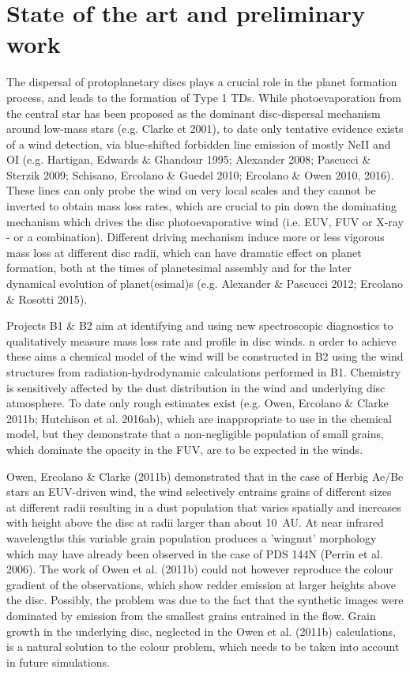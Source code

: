 \documentclass[10pt,fleqn,twoside]{article}
\newcommand{\Tcol}{\color{blue}}
\begin{document}
\section{\Tcol State of the art and preliminary work}
\renewcommand{\leftmark}{\sc State of the Art and preliminary work}

The dispersal of protoplanetary discs plays a crucial role in the
planet formation process, and leads to the formation of Type
1 TDs. While photoevaporation from the central star has been proposed
as the dominant disc-dispersal mechanism around low-mass stars
(e.g. Clarke et 2001), to date only tentative evidence exists of a
wind detection, via blue-shifted forbidden line emission of mostly
NeII and OI (e.g. Hartigan, Edwards \& Ghandour 1995; Alexander 2008;
Pascucci \& Sterzik 2009; Schisano, Ercolano \& Guedel 2010; Ercolano
\& Owen 2010, 2016). These lines can only probe the wind on very local
scales and they cannot be inverted to obtain mass loss rates, which
are crucial to pin down the dominating mechanism which drives the disc
photoevaporative wind
(i.e. EUV, FUV or X-ray - or a combination). Different driving
mechanism induce more or less vigorous mass loss at different disc
radii, which  can have dramatic effect on planet formation, both at
the times of planetesimal assembly and for the later dynamical
evolution of planet(esimal)s (e.g. Alexander \& Pascucci 2012;
Ercolano \& Rosotti 2015).   

Projects B1 \& B2 aim at identifying and using new spectroscopic
diagnostics to qualitatively measure mass loss rate and profile in disc 
winds. n order to achieve these aims a chemical model of the wind will
be constructed in B2 using the wind structures from
radiation-hydrodynamic calculations performed in B1. Chemistry is
sensitively affected by the dust distribution in the wind and
underlying disc atmosphere. To date only rough estimates exist
(e.g. Owen, Ercolano \& Clarke 2011b; Hutchison et al. 2016ab), which
are inappropriate to use in the chemical model, but they demonstrate
that a non-negligible population of small grains, which dominate the
opacity in the FUV, are to be expected in the winds. 

Owen, Ercolano \& Clarke (2011b) demonstrated that in the case of
Herbig Ae/Be stars an EUV-driven wind, the wind selectively entrains
grains of different sizes at different radii resulting in a dust
population that varies spatially and increases with height above the
disc at radii larger than about 10~AU. At near infrared wavelengths
this variable grain population produces a 'wingnut' morphology which
may have already been observed in the case of PDS 144N (Perrin et al.
2006). The work of Owen et al. (2011b) could not however reproduce the
colour gradient of the observations, which show redder emission at
larger heights above the disc. Possibly, the problem was due to the
fact that the synthetic images were dominated by emission from the
smallest grains entrained in the flow. Grain growth in the underlying
disc, neglected in the
Owen et al. (2011b) calculations, is a natural solution to
the colour problem, which needs to be taken into account in future
simulations. 
\end{document}
